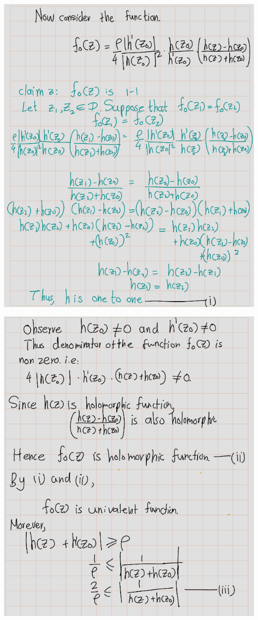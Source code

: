 \documentclass[
]{book}
\theoremstyle{definition}
\theoremstyle{definition}
\theoremstyle{definition}
\theoremstyle{definition}
\theoremstyle{remark}
\begin{document}
\begin{center}\includegraphics[width=8.97in]{figures/Riemann_Mapping_Therom/fig7} \end{center}

\begin{center}\includegraphics[width=8.85in]{figures/Riemann_Mapping_Therom/fig8} \end{center}
\end{document}
